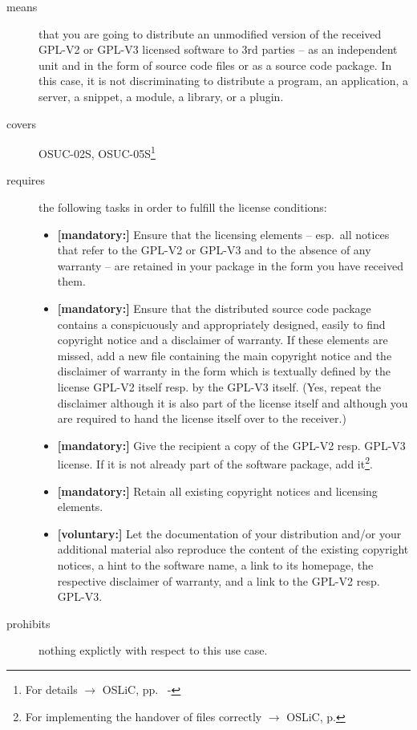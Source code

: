 \begin{description}

\item[means] that you are going to distribute an unmodified version of the
received GPL-V2 or GPL-V3 licensed software to 3rd parties -- as an independent
unit and in the form of source code files or as a source code package. In this
case, it is not discriminating to distribute a program, an application, a
server, a snippet, a module, a library, or a plugin.

\item[covers] OSUC-02S, OSUC-05S\footnote{For details $\rightarrow$
OSLiC, pp.\ \pageref{OSUC-02S-DEF} - \pageref{OSUC-05S-DEF}}

\item[requires] the following tasks in order to fulfill the license conditions:
\begin{itemize}
 
  \item \textbf{[mandatory:]} Ensure that the licensing elements -- esp.\ all
  notices that refer to the GPL-V2 or GPL-V3 and to the absence of any
  warranty -- are retained in your package in the form you have received them.

  \item \textbf{[mandatory:]} Ensure that the distributed source code package
  contains a conspicuously and appropriately designed, easily to find copyright
  notice and a disclaimer of warranty. If these elements are missed, add a new
  file containing the main copyright notice and the disclaimer of warranty in the
  form which is textually defined by the license GPL-V2 itself resp. by the
  GPL-V3 itself. (Yes, repeat the disclaimer although it is also part of the
  license itself and although you are required to hand the license itself over
  to the receiver.)
  
  \item \textbf{[mandatory:]} Give the recipient a copy of the GPL-V2 resp.
  GPL-V3 license. If it is not already part of the software package, add
  it\footnote{For implementing the handover of files correctly $\rightarrow$
  OSLiC, p. \pageref{DistributingFilesHint}}.

  \item \textbf{[mandatory:]} Retain all existing copyright notices and
  licensing elements.
    
  \item \textbf{[voluntary:]} Let the documentation of your distribution and/or
  your additional material also reproduce the content of the existing
  copyright notices, a hint to the software name, a link to its homepage,
  the respective disclaimer of warranty, and a link to the GPL-V2 resp.
  GPL-V3.

\end{itemize}

\item[prohibits] nothing explictly with respect to this use case.

\end{description}


